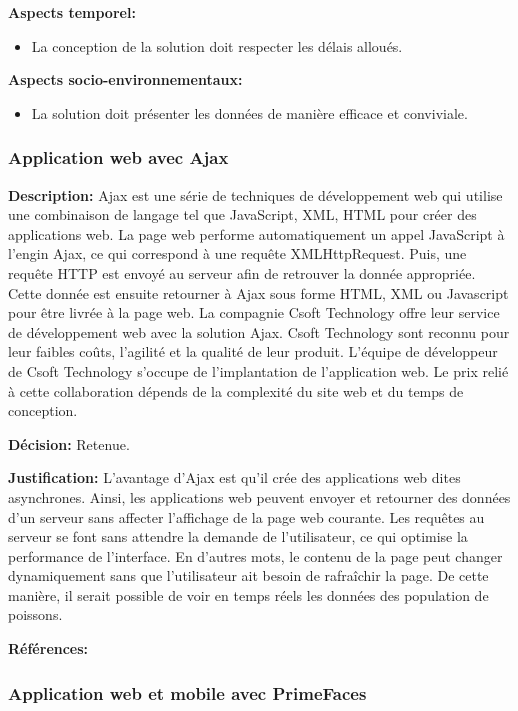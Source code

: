 \textbf{Aspects temporel:}
\begin{itemize} [label = {--}]
    \item La conception de la solution doit respecter les délais alloués.
\end{itemize}

\textbf{Aspects socio-environnementaux:}
\begin{itemize} [label = {--}]
    \item La solution doit présenter les données de manière efficace et conviviale.
\end{itemize}


\subsubsection{Application web avec Ajax}

\textbf{Description:} Ajax est une série de techniques de développement web qui utilise une combinaison de langage tel que JavaScript, XML, HTML pour créer des applications web. La page web performe automatiquement un appel JavaScript à l'engin Ajax, ce qui correspond à une requête XMLHttpRequest. Puis, une requête HTTP est envoyé au serveur afin de retrouver la donnée appropriée. Cette donnée est ensuite retourner à Ajax sous forme HTML, XML ou Javascript pour être livrée à la page web. La compagnie Csoft Technology offre leur service de développement web avec la solution Ajax. Csoft Technology sont reconnu pour leur faibles coûts, l'agilité et la qualité de leur produit. L'équipe de développeur de Csoft Technology s'occupe de l'implantation de l'application web. Le prix relié à cette collaboration dépends de la complexité du site web et du temps de conception.

\textbf{Décision:} Retenue.

\textbf{Justification:} L'avantage d'Ajax est qu'il crée des applications web dites asynchrones. Ainsi, les applications web peuvent envoyer et retourner des données d'un serveur sans affecter l'affichage de la page web courante. Les requêtes au serveur se font sans attendre la demande de l'utilisateur, ce qui optimise la performance de l'interface. En d'autres mots, le contenu de la page peut changer dynamiquement sans que l'utilisateur ait besoin de rafraîchir la page. De cette manière, il serait possible de voir en temps réels les données des population de poissons.

\textbf{Références:} \cite{Ajax_wiki} \cite{Ajax} \cite{Csoft}

\subsubsection{Application web et mobile avec PrimeFaces}

